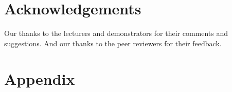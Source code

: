 \documentclass{sig-alt-release2}
\begin{document}
\section{Acknowledgements}
Our thanks to the lecturers and demonstrators for their comments and suggestions. 
And our thanks to the peer reviewers for their feedback. 




\section{Appendix}

\end{document}
